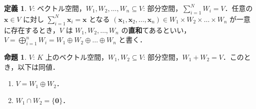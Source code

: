 \documentclass{jlreq}
\theoremstyle{definition}
\newtheorem{dfn}[thm]{定義}
\newtheorem{prop}[thm]{命題}
\begin{document}
      \begin{dfn}
        $V$: ベクトル空間，$W_1, W_2, \dots, W_n \subseteq V$: 部分空間，$\sum_{i=1}^NW_i = V$．任意の $\bm{x} \in V$ に対し $\sum_{i=1}^N\bm{x}_i=\bm{x}$ となる $(\bm{x}_1, \bm{x}_2, \dots, \bm{x}_n) \in W_1 \times W_2 \times \dots \times W_n$ が一意に存在するとき，$V$ は $W_1, W_2, \dots, W_n$ の\textbf{直和}てあるといい，$V=\bigoplus_{i=1}^nW_i=W_1 \oplus W_2 \oplus \dots \oplus W_n$ と書く．
      \end{dfn}
      \begin{prop}
        $V$: $K$ 上のベクトル空間，$W_1, W_2 \subseteq V$: 部分空間，$W_1 + W_2 = V$．このとき，以下は同値．
        \begin{enumerate}
          \item $V = W_1 \oplus W_2$．
          \item $W_1 \cap W_2 = \{\bm{0}\}$．
        \end{enumerate}
      \end{prop}
\end{document}
